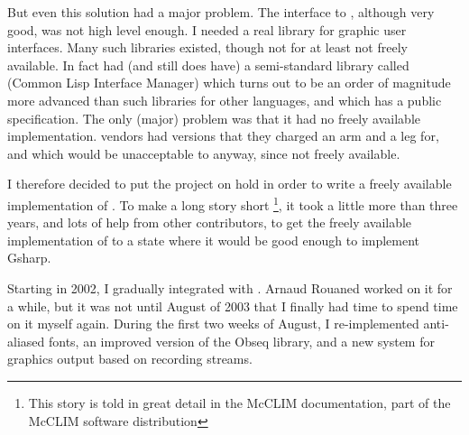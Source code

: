 But even this solution had a major problem.  The interface to {\xwin},
although very good, was not high level enough.  I needed a real
library for graphic user interfaces.  Many such libraries existed,
though not for {\commonlisp} at least not freely available.  In fact {\commonlisp} had
(and still does have) a semi-standard library called {\clim} (Common
Lisp Interface Manager) which turns out to be an order of magnitude
more advanced than such libraries for other languages, and which has a
public specification.  The only (major) problem was that it had no
freely available implementation.  {\commonlisp} vendors had versions that they
charged an arm and a leg for, and which would be unacceptable to \sysname{}
anyway, since not freely available.  

I therefore decided to put the \sysname{} project on hold in order to write
a freely available implementation of {\clim}.  To make a long story
short \footnote{This story is told in great detail in the McCLIM
  documentation, part of the McCLIM software distribution}, it took a
little more than three years, and lots of help from other
contributors, to get the freely available implementation of {\clim} to a
state where it would be good enough to implement Gsharp. 

Starting in 2002, I gradually integrated \sysname{} with {\clim}.  Arnaud
Rouaned worked on it for a while, but it was not until August of 2003
that I finally had time to spend time on it myself again.  During the
first two weeks of August, I re-implemented anti-aliased fonts, an
improved version of the Obseq library, and a new system for graphics
output based on {\clim} recording streams. 
